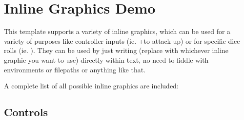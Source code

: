 \section{Inline Graphics Demo}

This template supports a variety of inline graphics, which can be used for a variety of purposes like controller inputs (ie. \controllerA+\controllerJoystickUp to attack up) or for specific dice rolls (ie. \diceSix\diceSix). They can be used by just writing \texttt{\controllerA} (replace with whichever inline graphic you want to use) directly within text, no need to fiddle with environments or filepaths or anything like that.

A complete list of all possible inline graphics are included:

\subsection{Controls}

